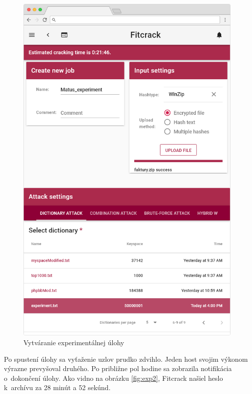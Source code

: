 \documentclass[slovak]{fitthesis}
\begin{document}
\begin{figure}[H]
    \centering
    \includegraphics[scale=0.4]{obrazky/exp1Frame.PNG}
    \caption{Vytváranie experimentálnej úlohy}
    \label{fig:exp1}
\end{figure}
Po spustení úlohy sa vyťaženie uzlov prudko zdvihlo. Jeden host svojim výkonom výrazne prevyšoval druhého. Po približne pol hodine sa zobrazila notifikácia o~dokončení úlohy. Ako vidno na obrázku \ref{fig:exp2}, Fitcrack našiel heslo k~archívu za 28 minút a 52 sekúnd.
\end{document}
